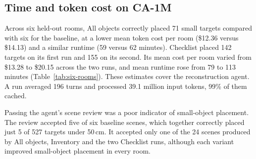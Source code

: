 \subsection{Time and token cost on CA-1M}
\label{sec:cost}
Across six held-out rooms, All objects correctly placed 71 small targets
compared with six for the baseline, at a lower mean token cost per room
(\$12.36 versus \$14.13) and a similar runtime (59 versus 62 minutes).
Checklist placed 142 targets on its first run and 155 on its second. Its
mean cost per room varied from \$13.28 to \$20.15 across the two runs,
and mean runtime rose from 79 to 113 minutes (Table~\ref{tab:six-rooms}).
These estimates cover the reconstruction agent. A run averaged 196 turns
and processed 39.1 million input tokens, 99\% of them cached.

Passing the agent's scene review was a poor indicator of small-object
placement. The review accepted five of six baseline scenes, which together
correctly placed just 5 of 527 targets under 50\,cm. It accepted only one
of the 24 scenes produced by All objects, Inventory and the two Checklist
runs, although each variant improved small-object placement in every room.
